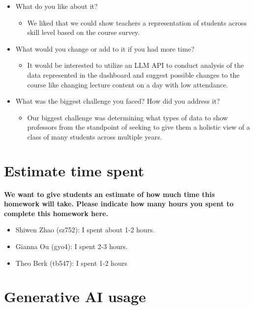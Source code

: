 \documentclass[
]{article}
\providecommand{\tightlist}{%
  \setlength{\itemsep}{0pt}\setlength{\parskip}{0pt}}
\begin{document}
\begin{itemize}
\tightlist
\item
  What do you like about it?

  \begin{itemize}
  \tightlist
  \item
    We liked that we could show teachers a representation of students
    across skill level based on the course survey.
  \end{itemize}
\item
  What would you change or add to it if you had more time?

  \begin{itemize}
  \tightlist
  \item
    It would be interested to utilize an LLM API to conduct analysis of
    the data represented in the dashboard and suggest possible changes
    to the course like changing lecture content on a day with low
    attendance.
  \end{itemize}
\item
  What was the biggest challenge you faced? How did you address it?

  \begin{itemize}
  \tightlist
  \item
    Our biggest challenge was determining what types of data to show
    professors from the standpoint of seeking to give them a holistic
    view of a class of many students across multiple years.
  \end{itemize}
\end{itemize}

\section{Estimate time spent}\label{estimate-time-spent}

\textbf{We want to give students an estimate of how much time this
homework will take. Please indicate how many hours you spent to complete
this homework here.}

\begin{itemize}
\tightlist
\item
  Shiwen Zhao (sz752): I spent about 1-2 hours.
\item
  Gianna Ou (gyo4): I spent 2-3 hours.
\item
  Theo Berk (tb547): I spent 1-2 hours
\end{itemize}

\section{Generative AI usage}\label{generative-ai-usage}
\end{document}
